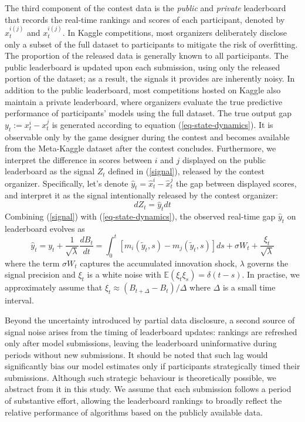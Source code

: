 \documentclass[mnsc]{informs3}
\begin{document}
The third component of the contest data is the \textit{public} and \textit{private} leaderboard that records the real-time rankings and scores of each participant, denoted by $\hat{x}^{i(j)}_t$ and $x^{i(j)}_t$. 
In Kaggle competitions, most organizers deliberately disclose only a subset of the full dataset to participants to mitigate the risk of overfitting. 
The proportion of the released data is generally known to all participants. 
The public leaderboard is updated upon each submission, using only the released portion of the dataset; as a result, the signals it provides are inherently noisy.
In addition to the public leaderboard, most competitions hosted on Kaggle also maintain a private leaderboard, where organizers evaluate the true predictive performance of participants’ models using the full dataset.
The true output gap $y_t := x^i_t - x^j_t$ is generated according to equation (\ref{eq-state-dynamics}).
It is observable only by the game designer during the contest and becomes available from the Meta-Kaggle dataset after the contest concludes. 
Furthermore, we interpret the difference in scores between $i$ and $j$ displayed on the public leaderboard as the signal $Z_t$ defined in (\ref{signal}), released by the contest organizer. 
Specifically, let's denote $\hat{y}_t = \hat{x}^i_t - \hat{x}^j_t$ the gap between displayed scores, and interpret it as the signal intentionally released by the contest organizer: 
\begin{equation}\label{eq-model-signal}
dZ_t = \hat{y}_tdt
\end{equation}
Combining (\ref{signal}) with (\ref{eq-state-dynamics}), the observed real-time gap $\hat{y}_t$ on leaderboard evolves as 
\begin{equation}\label{eq-leaderboard-gap}
\hat{y}_t = y_t + \frac{1}{\sqrt{\lambda}}\frac{dB_t}{dt} = \int^t_0\left[m_i(\tilde{y}_t, s) - m_j(\tilde{y}_t, s)\right]ds + \sigma W_{t} + \frac{\xi_t}{\sqrt{\lambda}}
\end{equation}
where the term $\sigma W_t$ captures the accumulated innovation shock, $\lambda$ governs the signal precision and $\xi_t$ is a white noise with $\mathbb{E}(\xi_t\xi_s) = \delta(t-s)$. 
In practise, we approximately assume that $\xi_t \approx (B_{t+\Delta} - B_t)/\Delta$ where $\Delta$ is a small time interval. 

Beyond the uncertainty introduced by partial data disclosure, a second source of signal noise arises from the timing of leaderboard updates: 
rankings are refreshed only after model submissions, leaving the leaderboard uninformative during periods without new submissions.
It should be noted that such lag would significantly bias our model estimates only if participants strategically timed their submissions.
Although such strategic behaviour is theoretically possible, we abstract from it in this study.
We assume that each submission follows a period of substantive effort, allowing the leaderboard rankings to broadly reflect the relative performance of algorithms based on the publicly available data.
\end{document}
